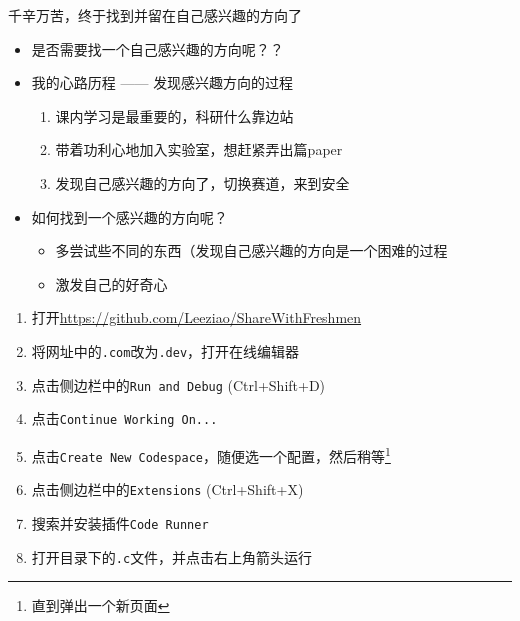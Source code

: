 \documentclass{ctexbeamer} %
\begin{document}
\begin{frame}
	\begin{center}\Large
	千辛万苦，终于找到并留在自己感兴趣的方向了
	\end{center}
\end{frame}

\begin{frame}
	\begin{itemize}
		\item 是否需要找一个自己感兴趣的方向呢？？
		\item 我的心路历程 —— \small{发现感兴趣方向的过程}
		\begin{enumerate}
			\item 课内学习是最重要的，科研什么靠边站
			\item 带着功利心地加入实验室，想赶紧弄出篇paper
			\item 发现自己感兴趣的方向了，切换赛道，来到安全
		\end{enumerate}
		\item 如何找到一个感兴趣的方向呢？
		\begin{itemize}
			\item 多尝试些不同的东西（发现自己感兴趣的方向是一个困难的过程
			\item 激发自己的好奇心
		\end{itemize}
	\end{itemize}
\end{frame}

\begin{frame}[fragile]
	\begin{enumerate}
		\item 打开\url{https://github.com/Leeziao/ShareWithFreshmen}
		\item 将网址中的\texttt{.com}改为\texttt{.dev}，打开在线编辑器
		\item 点击侧边栏中的\texttt{Run and Debug} (Ctrl+Shift+D)
		\item 点击\texttt{Continue Working On...}
		\item 点击\texttt{Create New Codespace}，随便选一个配置，然后稍等\footnote{直到弹出一个新页面}
		\item 点击侧边栏中的\texttt{Extensions} (Ctrl+Shift+X)
		\item 搜索并安装插件\texttt{Code Runner}
		\item 打开目录下的\texttt{.c}文件，并点击右上角箭头运行

	\end{enumerate}
\end{frame}
\end{document}
